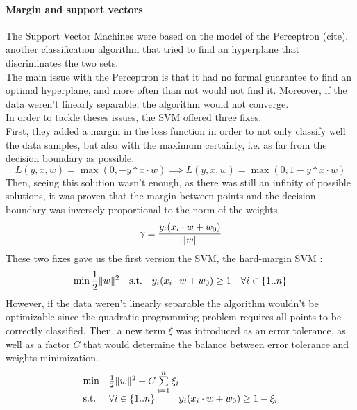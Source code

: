 \documentclass{article}
\DeclarePairedDelimiter{\norm}{\lVert}{\rVert}
\theoremstyle{definition}
\begin{document}
\paragraph{Margin and support vectors}
The Support Vector Machines were based on the model of the Perceptron (cite), another classification algorithm that tried to find an hyperplane that discriminates the two sets.\\
The main issue with the Perceptron is that it had no formal guarantee to find an optimal hyperplane, and more often than not would not find it. Moreover, if the data weren't linearly separable, the algorithm would not converge.\\
In order to tackle theses issues, the SVM offered three fixes. \\
First, they added a margin in the loss function in order to not only classify well the data samples, but also with the maximum certainty, i.e. as far from the decision boundary as possible.\\
\begin{equation}
    L(y,x,w) = \max(0,-y*x \cdot w) \implies L(y,x,w) = \max(0,1-y*x\cdot w)
\end{equation}
Then, seeing this solution wasn't enough, as there was still an infinity of possible solutions, it was proven that the margin between points and the decision boundary was inversely proportional to the norm of the weights.\\
\begin{equation}
\gamma = \frac{y_{i}(x_{i} \cdot w + w_{0})}{\norm{w}}
\end{equation}
These two fixes gave us the first version the SVM, the hard-margin SVM :\\ 
\begin{equation}
    \min \frac{1}{2}\norm{w}^{2} \quad
\textup{s.t.}\quad y_{i}(x_{i} \cdot w + w_{0}) \geq 1 \quad \forall i \in \{1..n\}
\end{equation}
However, if the data weren't linearly separable the algorithm wouldn't be optimizable since the quadratic programming problem requires all points to be correctly classified. Then, a new term $\xi$ was introduced as an error tolerance, as well as a factor $C$ that would determine the balance between error tolerance and weights minimization.\\
\begin{equation}
\begin{array}{ll@{}ll}
\text{min}  & \frac{1}{2}\norm{w}^{2}+C\sum\limits_{i=1}^{n}\xi_{i} &\\
\text{s.t.}& \forall i \in \{1..n\} & y_{i}(x_{i} \cdot w + w_{0}) \geq 1-\xi_{i}
\end{array}
\end{equation}
\end{document}
